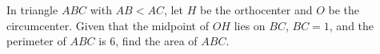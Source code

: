 In triangle $ABC$ with $AB<AC$, let $H$ be the orthocenter and $O$ be the circumcenter. Given that the midpoint of $OH$ lies on $BC$, $BC=1$, and the perimeter of $ABC$ is $6$, find the area of $ABC$.